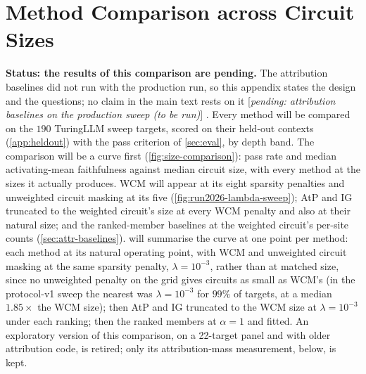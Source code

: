 \documentclass[10pt]{article}
\newif\ifexternal
\DeclareRobustCommand{\pending}[1]{%
  \ifexternal
    \ifvmode\textcolor{black!55}{[to be added]}\else\unskip\fi
  \else
    \textcolor{red!70!black}{[\textit{pending: #1}]}%
  \fi}
\begin{document}
\section{Method Comparison across Circuit Sizes}
\label{app:method-comparison}
\label{sec:method-comparison}
\textbf{Status: the results of this comparison are pending.}
The attribution baselines did not run with the production run, so this appendix states the design and the questions; no claim in the main text rests on it \pending{attribution baselines on the production sweep (to be run)}.
Every method will be compared on the $190$ TuringLLM sweep targets, scored on their held-out contexts (\cref{app:heldout}) with the pass criterion of \cref{sec:eval}, by depth band.
The comparison will be a curve first (\cref{fig:size-comparison}): pass rate and median activating-mean faithfulness against median circuit size, with every method at the sizes it actually produces.
WCM will appear at its eight sparsity penalties and unweighted circuit masking at its five (\cref{fig:run2026-lambda-sweep}); AtP and IG truncated to the weighted circuit's size at every WCM penalty and also at their natural size; and the ranked-member baselines at the weighted circuit's per-site counts (\cref{sec:attr-baselines}).
 will summarise the curve at one point per method: each method at its natural operating point, with WCM and unweighted circuit masking at the same sparsity penalty, $\lambda = 10^{-3}$, rather than at matched size, since no unweighted penalty on the grid gives circuits as small as WCM's (in the protocol-v1 sweep the nearest was $\lambda = 10^{-3}$ for $99\%$ of targets, at a median $1.85\times$ the WCM size); then AtP and IG truncated to the WCM size at $\lambda = 10^{-3}$ under each ranking; then the ranked members at $\alpha = 1$ and fitted.
An exploratory version of this comparison, on a 22-target panel and with older attribution code, is retired; only its attribution-mass measurement, below, is kept.
\end{document}
